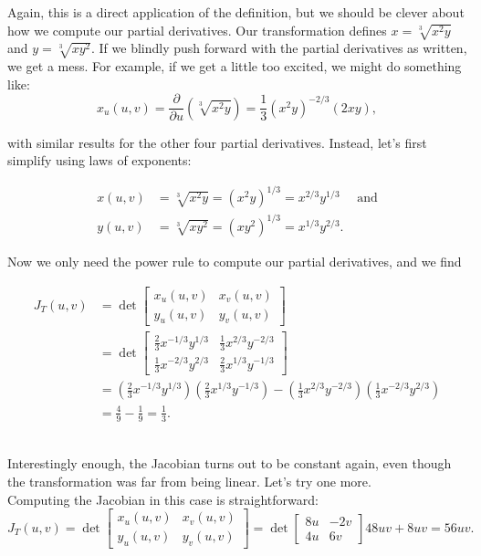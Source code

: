 {Again, this is a direct application of the definition, but we should be clever about how we compute our partial derivatives. Our transformation defines $x=\sqrt[3]{x^2y}$ and $y=\sqrt[3]{xy^2}$. If we blindly push forward with the partial derivatives as written, we get a mess. For example, if we get a little too excited, we might do something like:
\[
x_u(u,v) = \frac{\partial}{\partial u}(\sqrt[3]{x^2y}) = \frac{1}{3}(x^2y)^{-2/3}(2xy),
\]

with similar results for the other four partial derivatives. Instead, let's first simplify using laws of exponents:

\begin{align*}
x(u,v) &= \sqrt[3]{x^2y} = (x^2y)^{1/3} = x^{2/3}y^{1/3} \quad\text{ and}\\
y(u,v) &= \sqrt[3]{xy^2} = (xy^2)^{1/3} = x^{1/3}y^{2/3}.
\end{align*}

Now we only need the power rule to compute our partial derivatives, and we find

\begin{align*}
J_T(u,v) &= \det\begin{bmatrix}x_u(u,v)&x_v(u,v)\\y_u(u,v)&y_v(u,v)\end{bmatrix} \\
&= \det\begin{bmatrix}\frac23 x^{-1/3}y^{1/3}& \frac13 x^{2/3}y^{-2/3}\\ \frac13 x^{-2/3}y^{2/3}& \frac23 x^{1/3}y^{-1/3}\end{bmatrix}\\
&= \left(\frac23 x^{-1/3}y^{1/3}\right)\left( \frac23 x^{1/3}y^{-1/3}\right)-\left(\frac13 x^{2/3}y^{-2/3}\right)\left(\frac13 x^{-2/3}y^{2/3}\right)\\
&=\frac49 -\frac19 = \frac13.
\end{align*}
\baselineskip}\\

Interestingly enough, the Jacobian turns out to be constant again, even though the transformation was far from being linear. Let's try one more.\\

{Computing the Jacobian in this case is straightforward:
\[
J_T(u,v) = \det\begin{bmatrix}x_u(u,v)&x_v(u,v)\\y_u(u,v)&y_v(u,v)\end{bmatrix} = \det\begin{bmatrix} 8u&-2v\\4u&6v\end{bmatrix} 48uv+8uv=56uv.
\]
\baselineskip}\\

